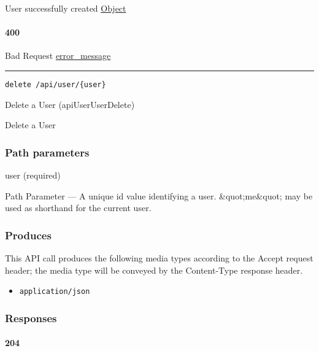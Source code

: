 User successfully created \protect\hyperlink{Object}{Object}

\hypertarget{section-483}{%
\paragraph{400}\label{section-483}}

Bad Request \protect\hyperlink{error_message}{error\_message}

\begin{center}\rule{0.5\linewidth}{\linethickness}\end{center}

\protect\hypertarget{apiUserUserDelete}{}{}

\begin{verbatim}
delete /api/user/{user}
\end{verbatim}

Delete a User ({apiUserUserDelete})

Delete a User

\hypertarget{path-parameters-80}{%
\subsubsection{Path parameters}\label{path-parameters-80}}

user (required)

{Path Parameter} --- A unique id value identifying a user.
\&quot;me\&quot; may be used as shorthand for the current user.

\hypertarget{produces-146}{%
\subsubsection{Produces}\label{produces-146}}

This API call produces the following media types according to the
{Accept} request header; the media type will be conveyed by the
{Content-Type} response header.

\begin{itemize}
\tightlist
\item
  \texttt{application/json}
\end{itemize}

\hypertarget{responses-151}{%
\subsubsection{Responses}\label{responses-151}}

\hypertarget{section-484}{%
\paragraph{204}\label{section-484}}

